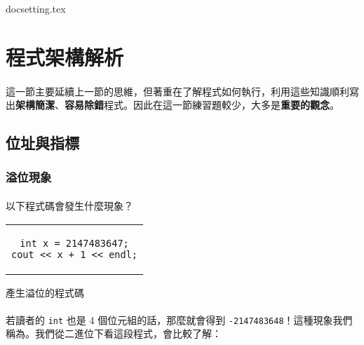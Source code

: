 \documentclass[12pt,a4paper,oneside]{article}
\begin{document}
\begin{CJK}{UTF8}{bkai}

{docsetting.tex}
\setcounter{section}{1}

\fi


\section{程式架構解析}

\paragraph{}這一節主要延續上一節的思維，但著重在了解程式如何執行，利用這些知識順利寫出\textbf{架構簡潔}、\textbf{容易除錯}程式。因此在這一節練習題較少，大多是\textbf{重要的觀念}。

\subsection{位址與指標}

\subsubsection{溢位現象}

\paragraph{}以下程式碼會發生什麼現象？
\begin{code}[h!]
\centering
\begin{tabular}{c}
\begin{lstlisting}
int x = 2147483647;
cout << x + 1 << endl;
\end{lstlisting}
\end{tabular}
\caption{產生溢位的程式碼}
\label{program:struct:code:overflow}
\end{code}

\paragraph{}若讀者的 \lstinline!int! 也是 4 個位元組的話，那麼就會得到 \lstinline!-2147483648!！這種現象我們稱為。我們從二進位下看這段程式，會比較了解：


\end{CJK}
\end{document}
